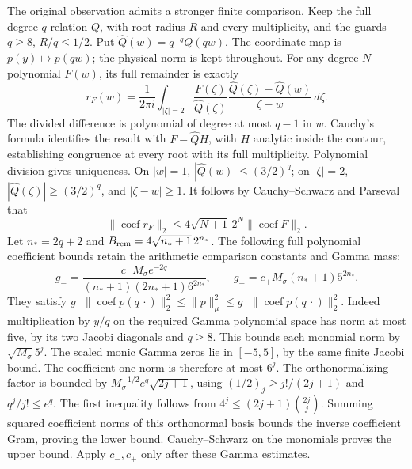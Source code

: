 \documentclass[11pt]{article}
\begin{document}
The original observation admits a stronger finite comparison. Keep
the full degree-$q$ relation $Q$, with root radius $R$ and every
multiplicity, and the guards $q\ge8$, $R/q\le1/2$.
Put $\widehat Q(w)=q^{-q}Q(qw)$. The coordinate map is
$p(y)\mapsto p(qw)$; the physical norm is kept throughout.
For any degree-$N$ polynomial $F(w)$, its full remainder is exactly
\[
r_F(w)=\frac1{2\pi i}\int_{|\zeta|=2}
\frac{F(\zeta)}{\widehat Q(\zeta)}
\frac{\widehat Q(\zeta)-\widehat Q(w)}{\zeta-w}\,d\zeta .
\]
The divided difference is polynomial of degree at most $q-1$ in $w$.
Cauchy's formula identifies the result with $F-\widehat QH$,
with $H$ analytic inside the contour, establishing congruence at
every root with its full multiplicity. Polynomial division gives
uniqueness.
On $|w|=1$, $|\widehat Q(w)|\le(3/2)^q$; on $|\zeta|=2$,
$|\widehat Q(\zeta)|\ge(3/2)^q$, and $|\zeta-w|\ge1$.
It follows by Cauchy--Schwarz and Parseval that
\[
\|\operatorname{coef}r_F\|_2
\le4\sqrt{N+1}\,2^N\|\operatorname{coef}F\|_2.
\]
Let $n_*=2q+2$ and $B_{\rm rem}=4\sqrt{n_*+1}\,2^{n_*}$.
The following full polynomial coefficient bounds retain the
arithmetic comparison constants and Gamma mass:
\[
g_-=\frac{c_-M_\sigma e^{-2q}}
{(n_*+1)(2n_*+1)6^{2n_*}},\qquad
g_+=c_+M_\sigma(n_*+1)5^{2n_*}.
\]
They satisfy
$g_-\|\operatorname{coef}p(q\,\cdot)\|_2^2
\le\|p\|_\mu^2\le
g_+\|\operatorname{coef}p(q\,\cdot)\|_2^2$.
Indeed multiplication by $y/q$ on the required Gamma polynomial
space has norm at most five, by its two Jacobi diagonals and
$q\ge8$. This bounds each monomial norm by $\sqrt{M_\sigma}5^j$.
The scaled monic Gamma zeros lie in $[-5,5]$, by the same finite
Jacobi bound. The coefficient one-norm is therefore at most $6^j$.
The orthonormalizing factor is bounded by
$M_\sigma^{-1/2}e^q\sqrt{2j+1}$, using
$(1/2)_j\ge j!/(2j+1)$ and $q^j/j!\le e^q$.
The first inequality follows from
$4^j\le(2j+1)\binom{2j}{j}$.
Summing squared coefficient norms of this orthonormal basis
bounds the inverse coefficient Gram, proving the lower bound.
Cauchy--Schwarz on the monomials proves the upper bound.
Apply $c_-,c_+$ only after these Gamma estimates.
\end{document}
